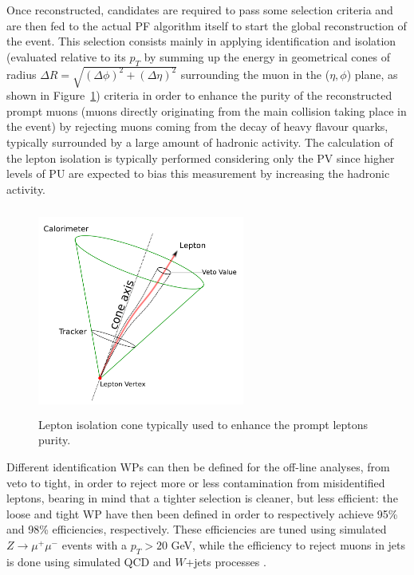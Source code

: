 \documentclass[a4paper, 10pt, openright]{report}
\begin{document}
Once reconstructed, candidates are required to pass some selection criteria and are then fed to the actual \ac{PF} algorithm itself to start the global reconstruction of the event. This selection consists mainly in applying identification and isolation (evaluated relative to its $p_T$ by summing up the energy in geometrical cones of radius $\Delta R = \sqrt{(\Delta \phi)^2 + (\Delta \eta)^2}$ surrounding the muon in the ($\eta, \phi$) plane, as shown in Figure~\ref{fig:IsoCone}) criteria in order to enhance the purity of the reconstructed prompt muons (muons directly originating from the main collision taking place in the event) by rejecting muons coming from the decay of heavy flavour quarks, typically surrounded by a large amount of hadronic activity. The calculation of the lepton isolation is typically performed considering only the \ac{PV} since higher levels of \ac{PU} are expected to bias this measurement by increasing the hadronic activity.

\begin{figure}[htbp]
\begin{center}
\includegraphics[width=6.8cm, height=6.8cm]{figs/IsoCone.png}
\caption{Lepton isolation cone typically used to enhance the prompt leptons purity.}
\label{fig:IsoCone}
\end{center}
\end{figure}

Different identification \acfp{WP} can then be defined for the off-line analyses, from veto to tight, in order to reject more or less contamination from misidentified leptons, bearing in mind that a tighter selection is cleaner, but less efficient: the loose and tight \ac{WP} have then been defined in order to respectively achieve 95\% and 98\% efficiencies, respectively. These efficiencies are tuned using simulated $Z \rightarrow \mu^+ \mu^-$ events with a $p_T > 20$ GeV, while the efficiency to reject muons in jets is done using simulated QCD and $W$+jets processes \cite{MuonSystemsEff}.
\end{document}
